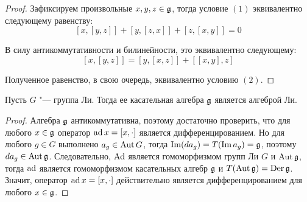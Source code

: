 \begin{proof}
	Зафиксируем произвольные $x, y, z \in \mathfrak g$, тогда условие $(1)$ эквивалентно следующему равенству:
	\[[x, [y, z]] + [y, [z, x]] + [z, [x, y]] = 0\]
	
	В силу антикоммутативности и билинейности, это эквивалентно следующему:
	\[[x, [y, z]] = [y, [x, z]] + [[x, y], z]\]
	
	Полученное равенство, в свою очередь, эквивалентно условию $(2)$.
\end{proof}

\begin{corollary}
	Пусть $G$ "--- группа Ли. Тогда ее касательная алгебра $\mathfrak g$ является алгеброй Ли.
\end{corollary}

\begin{proof}
	Алгебра $\mathfrak g$ антикоммутативна, поэтому достаточно проверить, что для любого $x \in \mathfrak g$ оператор $\operatorname{ad} x = [x, \cdot]$ является дифференцированием. Но для любого $g \in G$ выполнено $a_g \in \operatorname{Aut} G$, тогда $\operatorname{Im} (da_g) = T(\operatorname{Im} a_g) = \mathfrak g$, поэтому $da_g \in \operatorname{Aut}\mathfrak g$. Следовательно, $\operatorname{Ad}$ является гомоморфизмом групп Ли $G$ и $\operatorname{Aut}{\mathfrak g}$, тогда $\operatorname{ad}$ является гомоморфизмом касательных алгебр $\mathfrak g$ и $T(\operatorname{Aut}{\mathfrak g}) = \operatorname{Der}{\mathfrak g}$. Значит, оператор $\operatorname{ad} x = [x, \cdot]$ действительно является дифференцированием для любого $x \in \mathfrak g$.
\end{proof}